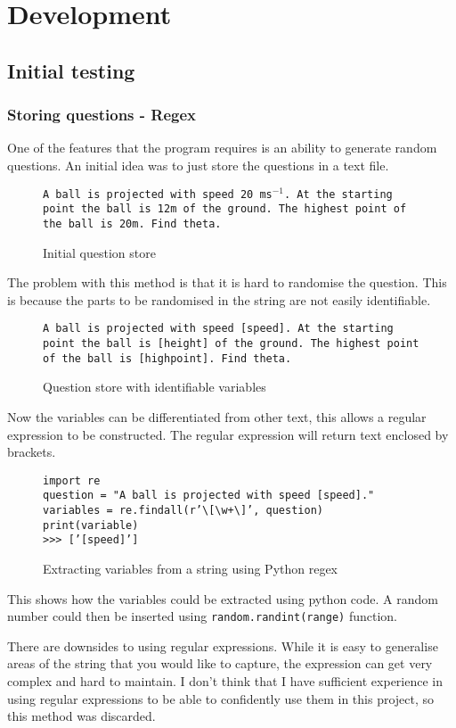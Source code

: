 \chapter{Development}
\section{Initial testing}
\subsection{Storing questions - Regex}
One of the features that the program requires is an ability to generate random questions. An initial idea was to just store the questions in a text file.
\begin{figure}[H]
	\centering
	\texttt{A ball is projected with speed 20 ms$^{-1}$. At the starting point the ball is 12m of the ground. The highest point of the ball is 20m. Find theta.}
	\caption{Initial question store}
\end{figure} 
The problem with this method is that it is hard to randomise the question. This is because the parts to be randomised in the string are not easily identifiable. 
\begin{figure}[H]
	\centering
	\texttt{A ball is projected with speed [speed]. At the starting point the ball is [height] of the ground. The highest point of the ball is [highpoint]. Find theta.} 
	\caption{Question store with identifiable variables}
\end{figure}
Now the variables can be differentiated from other text, this allows a regular expression to be constructed. The regular expression  will return text enclosed by brackets.
\begin{figure}[H]
	\texttt{import re\\
		question = "A ball is projected with speed [speed]."\\
		variables = re.findall(r'\textbackslash [\textbackslash w+\textbackslash ]', question)\\
		print(variable)\\
		>>> ['[speed]']}
	\caption{Extracting variables from a string using Python regex}
\end{figure} 
This shows how the variables could be extracted using python code. A random number could then be inserted using \texttt{random.randint(range)} function. 

There are downsides to using regular expressions. While it is easy to generalise areas of the string that you would like to capture, the expression can get very complex and hard to maintain. I don't think that I have sufficient experience in using regular expressions to be able to confidently use them in this project, so this method was discarded.
